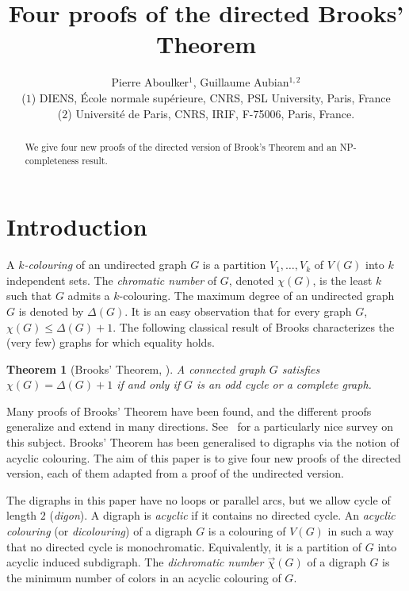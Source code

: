 \documentclass[11pt]{article}
\title{Four proofs of the directed Brooks' Theorem}
\author{Pierre Aboulker$^1$, Guillaume Aubian$^{1,2}$\\
\small ($1$) DIENS, \'Ecole normale sup\'erieure, CNRS, PSL University, Paris, France\\
\small ($2$) Université de Paris, CNRS, IRIF, F-75006, Paris, France.}
\newtheorem{theorem}[lemma]{Theorem}
\newcommand{\dic}{\vec{\chi}}
\begin{document}
\maketitle
\begin{abstract}
 We give four new proofs of the directed version of Brook's Theorem and an NP-completeness result. 
\end{abstract}

\section{Introduction}
A \emph{ $k$-colouring} of an undirected graph $G$ is a partition $V_1, \dots, V_k$ of $V(G)$ into $k$ independent sets. The \emph{chromatic number} of $G$, denoted  $\chi(G)$, is the least $k$ such that $G$ admits a $k$-colouring. 
The maximum degree of an undirected graph $G$ is denoted by $\Delta(G)$. It is an easy observation that for every graph $G$, $\chi(G) \leq \Delta(G)+1$. The following classical result of Brooks characterizes the (very few) graphs for which equality holds. 
\begin{theorem}[Brooks' Theorem, \cite{B41}]
A connected graph $G$ satisfies $\chi(G) = \Delta(G) + 1$ if and only if $G$ is an odd cycle or a complete graph. 
\end{theorem}

Many proofs of Brooks' Theorem have been found, and the different proofs generalize and extend in many directions. See~\cite{CR14} for a particularly nice survey on this subject. 
Brooks' Theorem has been generalised to digraphs via the notion of acyclic colouring. 
The aim of this paper is to give four new proofs of the directed version, each of them adapted from a proof of the undirected version. 
\medskip


The digraphs in this paper  have no loops or parallel arcs, but we allow cycle of length $2$ (\textit{digon}). A digraph is \textit{acyclic} if it contains no directed cycle. 
An \emph{acyclic colouring} (or \emph{dicolouring}) of a digraph $G$ is a colouring of $V(G)$ in such a way that no directed cycle is monochromatic. Equivalently, it is a partition of $G$ into acyclic induced subdigraph. 
The \emph{dichromatic number $\dic(G)$} of a digraph $G$ is the minimum number of colors in an acyclic colouring of $G$. 
\end{document}
